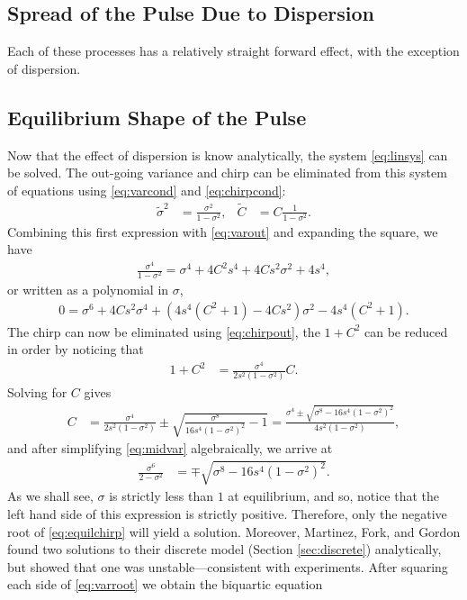 \subsection{Spread of the Pulse Due to Dispersion}
Each of these processes has a relatively straight forward effect, with the exception of dispersion.


\subsection{Equilibrium Shape of the Pulse}
Now that the effect of dispersion is know analytically, the system \eqref{eq:linsys} can be solved. The out-going variance and chirp can be eliminated from this system of equations using \eqref{eq:varcond} and \eqref{eq:chirpcond}:
\begin{align*}
\widetilde{\sigma}^2 &= \frac{\sigma^2}{1 - \sigma^2}, & \widetilde{C} &= C \frac{1}{1 - \sigma^2}.
\end{align*}
Combining this first expression with \eqref{eq:varout} and expanding the square, we have
\begin{align*}
\frac{\sigma^4}{1 - \sigma^2} = \sigma^4 + 4 C^2 s^4 + 4 C s^2 \sigma^2 + 4s^4,
\end{align*}
or written as a polynomial in $\sigma$,
\begin{align}
0 = \sigma^6 + 4 C s^2 \sigma^4 + \left( 4s^4 (C^2 + 1) - 4 C s^2 \right) \sigma^2 - 4s^4 (C^2 + 1).
\label{eq:midvar}
\end{align}
The chirp can now be eliminated using \eqref{eq:chirpout}, the $1+C^2$ can be reduced in order by noticing that
\begin{align*}
1 + C^2 &= \frac{\sigma^4}{2s^2(1 - \sigma^2)} C.
\end{align*}
Solving for $C$ gives
\begin{align}
\label{eq:equilchirp}
C &= \frac{\sigma^4}{2s^2(1 - \sigma^2)} \pm \sqrt{\frac{\sigma^8}{16s^4(1 - \sigma^2)^2} - 1} = \frac{\sigma^4 \pm \sqrt{\sigma^8 - 16s^4(1 - \sigma^2)^2}}{4s^2(1 - \sigma^2)},
\end{align}
and after simplifying \eqref{eq:midvar} algebraically, we arrive at
\begin{align}
\frac{\sigma^6}{2 - \sigma^2} &= \mp \sqrt{\sigma^8 - 16s^4(1 - \sigma^2)^2}.
\label{eq:varroot}
\end{align}
As we shall see, $\sigma$ is strictly less than $1$ at equilibrium, and so, notice that the left hand side of this expression is strictly positive. Therefore, only the negative root of \eqref{eq:equilchirp} will yield a solution. Moreover, Martinez, Fork, and Gordon \cite{martinez1984} found two solutions to their discrete model (Section \ref{sec:discrete}) analytically, but showed that one was unstable---consistent with experiments. After squaring each side of \eqref{eq:varroot} we obtain the biquartic equation
